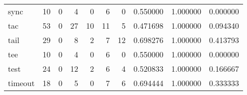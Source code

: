 \begin{tabular}{lrrrrrrrrr}
sync      &                                       10 &                                                  0 &                                                  4 &                                                  0 &                                                  6 &                                                  0 &                                           0.550000 &                               1.000000 &                             0.000000 \\
tac       &                                       53 &                                                  0 &                                                 27 &                                                 10 &                                                 11 &                                                  5 &                                           0.471698 &                               1.000000 &                             0.094340 \\
tail      &                                       29 &                                                  0 &                                                  8 &                                                  2 &                                                  7 &                                                 12 &                                           0.698276 &                               1.000000 &                             0.413793 \\
tee       &                                       10 &                                                  0 &                                                  4 &                                                  0 &                                                  6 &                                                  0 &                                           0.550000 &                               1.000000 &                             0.000000 \\
test      &                                       24 &                                                  0 &                                                 12 &                                                  2 &                                                  6 &                                                  4 &                                           0.520833 &                               1.000000 &                             0.166667 \\
timeout   &                                       18 &                                                  0 &                                                  5 &                                                  0 &                                                  7 &                                                  6 &                                           0.694444 &                               1.000000 &                             0.333333 \\

\end{tabular}
